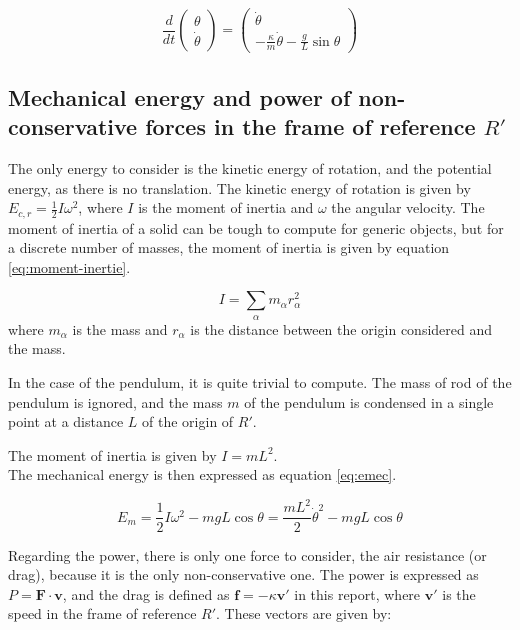 \documentclass[a4paper,12pt,twoside]{article}
\begin{document}
\begin{equation}
	\frac{d}{dt}
	\begin{pmatrix}
		\theta \\ \dot{\theta}
	\end{pmatrix}
	= \begin{pmatrix}
	\dot{\theta} \\
		-\frac{\kappa}{m}\dot{\theta} - \frac{g}{L}\sin\theta
	\end{pmatrix}
	\label{eq:equa-diff-sys}
\end{equation}

\subsection{Mechanical energy and power of non-conservative forces in the frame of reference $R'$}
The only energy to consider is the kinetic energy of rotation, and the potential energy, as there is no translation.
The kinetic energy of rotation is given by $E_{c,r} = \frac{1}{2}I\omega^2$, where $I$ is the moment of inertia and $\omega$ the angular velocity.
The moment of inertia of a solid can be tough to compute for generic objects, but for a discrete number of masses, the moment of inertia is given by equation \ref{eq:moment-inertie}. \cite{ans:moment-inertie} %

\begin{equation}
	I = \sum_\alpha m_\alpha r_\alpha^2
	\label{eq:moment-inertie}
\end{equation}
where $m_\alpha$ is the mass and $r_\alpha$ is the distance between the origin considered and the mass.

In the case of the pendulum, it is quite trivial to compute.
The mass of rod of the pendulum is ignored, and the mass $m$ of the pendulum is condensed in a single point at a distance $L$ of the origin of $R'$.

The moment of inertia is given by $I=mL^2$.\\ %

The mechanical energy is then expressed as equation \ref{eq:emec}.

\begin{equation}
	E_m = \frac{1}{2}I\omega^2 - mgL\cos\theta =  \frac{mL^2}{2}\dot{\theta}^2 - mgL\cos\theta
	\label{eq:emec}
\end{equation}

Regarding the power, there is only one force to consider, the air resistance (or drag), because it is the only non-conservative one.
The power is expressed as $P = \mathbf{F}\cdot\mathbf{v}$, and the drag is defined as $\mathbf{f} = -\kappa\mathbf{v'}$ in this report, where $\mathbf{v'}$ is the speed in the frame of reference $R'$.
These vectors are given by:
\end{document}
